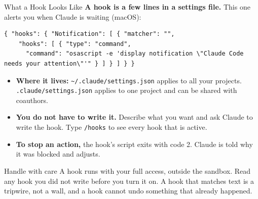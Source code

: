 \documentclass[aspectratio=169, 11pt]{beamer}
\begin{document}
\begin{frame}[fragile]{What a Hook Looks Like}
  \footnotesize
  \textbf{A hook is a few lines in a settings file.} This one alerts you when Claude is waiting (macOS):
  \begin{lstlisting}[basicstyle=\ttfamily\tiny]
{ "hooks": { "Notification": [ { "matcher": "",
    "hooks": [ { "type": "command",
      "command": "osascript -e 'display notification \"Claude Code needs your attention\"'" } ] } ] } }
  \end{lstlisting}
  \vspace{-0.4em}
  \begin{itemize}\footnotesize
    \item \textbf{Where it lives:} \texttt{\textasciitilde/.claude/settings.json} applies to all your projects. \texttt{.claude/settings.json} applies to one project and can be shared with coauthors.
    \item \textbf{You do not have to write it.} Describe what you want and ask Claude to write the hook. Type \texttt{/hooks} to see every hook that is active.
    \item \textbf{To stop an action,} the hook's script exits with code 2. Claude is told why it was blocked and adjusts.
  \end{itemize}

  \vspace{0.2em}
  \begin{alertblock}{Handle with care}
    A hook runs with your full access, outside the sandbox. Read any hook you did not write before you turn it on. A hook that matches text is a tripwire, not a wall, and a hook cannot undo something that already happened.
  \end{alertblock}
\end{frame}

\end{document}

